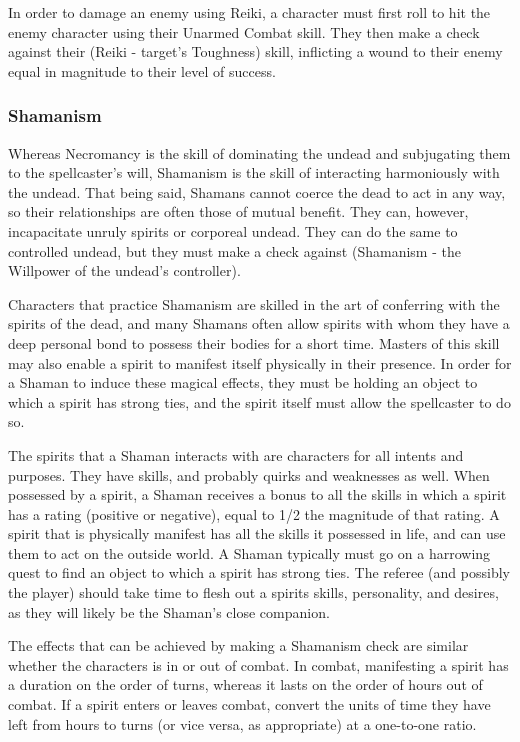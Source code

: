 \documentclass[oneside]{book}
\begin{document}
\begin{multicols}{2}
In order to damage an enemy using Reiki, a character must first roll to hit the enemy character using their Unarmed Combat skill. They then make a check against their (Reiki - target's Toughness) skill, inflicting a wound to their enemy equal in magnitude to their level of success. 

\subsubsection{Shamanism}
Whereas Necromancy is the skill of dominating the undead and subjugating them to the spellcaster's will, Shamanism is the skill of interacting harmoniously with the undead. That being said, Shamans cannot coerce the dead to act in any way, so their relationships are often those of mutual benefit. They can, however, incapacitate unruly spirits or corporeal undead. They can do the same to controlled undead, but they must make a check against (Shamanism - the Willpower of the undead's controller).

Characters that practice Shamanism are skilled in the art of conferring with the spirits of the dead, and many Shamans often allow spirits with whom they have a deep personal bond to possess their bodies for a short time. Masters of this skill may also enable a spirit to manifest itself physically in their presence. In order for a Shaman to induce these magical effects, they must be holding an object to which a spirit has strong ties, and the spirit itself must allow the spellcaster to do so. 

The spirits that a Shaman interacts with are characters for all intents and purposes. They have skills, and probably quirks and weaknesses as well. When possessed by a spirit, a Shaman receives a bonus to all the skills in which a spirit has a rating (positive or negative), equal to 1/2 the magnitude of that rating. A spirit that is physically manifest has all the skills it possessed in life, and can use them to act on the outside world. A Shaman typically must go on a harrowing quest to find an object to which a spirit has strong ties. The referee (and possibly the player) should take time to flesh out a spirits skills, personality, and desires, as they will likely be the Shaman's close companion.

The effects that can be achieved by making a Shamanism check are similar whether the characters is in or out of combat. In combat, manifesting a spirit has a duration on the order of turns, whereas it lasts on the order of hours out of combat. If a spirit enters or leaves combat, convert the units of time they have left from hours to turns (or vice versa, as appropriate) at a one-to-one ratio. 


\end{multicols}
\end{document}
